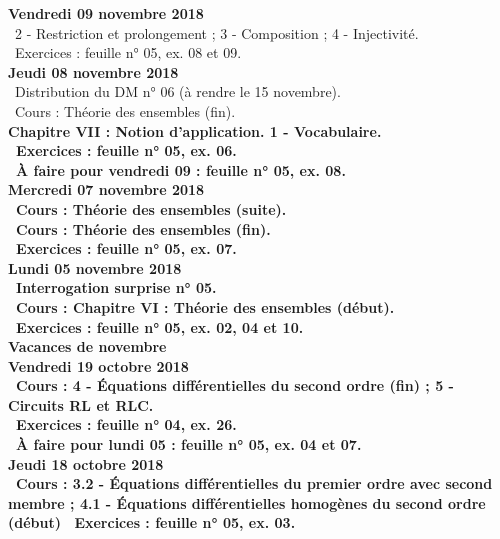 \documentclass[12pt,a4paper]{article}
\begin{document}
\noindent\textbf{Vendredi 09 novembre 2018}\\
\cours\ 2 - Restriction et prolongement ; 3 - Composition ; 4 - Injectivité.\\
\bu\ Exercices : feuille n° 05, ex. 08 et 09.\vspace{.4cm}\\

\noindent\textbf{Jeudi 08 novembre 2018}\\
\bu\ Distribution du DM n° 06 (à rendre le 15 novembre).\\
\bu\ Cours : Théorie des ensembles (fin).\\
\bf Chapitre VII \rm : Notion d'application. 1 - Vocabulaire.\\
\bu\ Exercices : feuille n° 05, ex. 06.\\
\bu\ À faire pour vendredi 09 : feuille n° 05, ex. 08.\vspace{.4cm}\\
 
\noindent\textbf{\bf Mercredi 07 novembre 2018}\\
\bu\ Cours : Théorie des ensembles (suite).\\
\bu\ Cours : Théorie des ensembles (fin).\\
\bu\ Exercices : feuille n° 05, ex. 07.\vspace{.4cm}\\

\noindent\textbf{Lundi 05 novembre 2018}\\
\bu\ Interrogation surprise n° 05.\\
\bu\ Cours : \bf Chapitre VI \rm : Théorie des ensembles (début).\\
\bu\ Exercices : feuille n° 05, ex. 02, 04 et 10.\vspace{.4cm}\\

\noindent\textbf{ Vacances de novembre }\vspace{.4cm}\\

\noindent\textbf{Vendredi 19 octobre 2018}\\
\bu\ Cours : 4 - Équations différentielles du second ordre (fin) ; 5 - Circuits RL et RLC.\\
\bu\ Exercices : feuille n° 04, ex. 26.\\
\bu\ À faire pour lundi 05 : feuille n° 05, ex. 04 et 07.\vspace{.4cm}\\

\noindent\textbf{Jeudi 18 octobre 2018}\\
\bu\ Cours : 3.2 - Équations différentielles du premier ordre avec second membre ; 4.1 - Équations 
différentielles homogènes du second ordre (début)
\bu\ Exercices : feuille n° 05, ex. 03.\vspace{.4cm}\\
 
\end{document}
